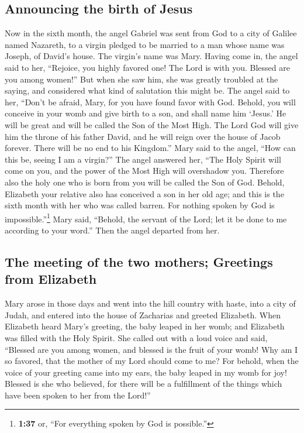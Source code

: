 \hypertarget{announcing-the-birth-of-jesus}{%
\subsection{Announcing the birth of
Jesus}\label{announcing-the-birth-of-jesus}}

 Now in the sixth month, the angel Gabriel was sent from
God to a city of Galilee named Nazareth,  to a virgin
pledged to be married to a man whose name was Joseph, of David's house.
The virgin's name was Mary.  Having come in, the angel
said to her, ``Rejoice, you highly favored one! The Lord is with you.
Blessed are you among women!''  But when she saw him, she
was greatly troubled at the saying, and considered what kind of
salutation this might be.  The angel said to her, ``Don't
be afraid, Mary, for you have found favor with God. 
Behold, you will conceive in your womb and give birth to a son, and
shall name him `Jesus.'  He will be great and will be
called the Son of the Most High. The Lord God will give him the throne
of his father David,  and he will reign over the house of
Jacob forever. There will be no end to his Kingdom.'' 
Mary said to the angel, ``How can this be, seeing I am a virgin?''
 The angel answered her, ``The Holy Spirit will come on
you, and the power of the Most High will overshadow you. Therefore also
the holy one who is born from you will be called the Son of God.
 Behold, Elizabeth your relative also has conceived a son
in her old age; and this is the sixth month with her who was called
barren.  For nothing spoken by God is
impossible.''\footnote{\textbf{1:37} or, ``For everything spoken by God
  is possible.''}  Mary said, ``Behold, the servant of
the Lord; let it be done to me according to your word.'' Then the angel
departed from her.

\hypertarget{the-meeting-of-the-two-mothers-greetings-from-elizabeth}{%
\subsection{The meeting of the two mothers; Greetings from
Elizabeth}\label{the-meeting-of-the-two-mothers-greetings-from-elizabeth}}

 Mary arose in those days and went into the hill country
with haste, into a city of Judah,  and entered into the
house of Zacharias and greeted Elizabeth.  When Elizabeth
heard Mary's greeting, the baby leaped in her womb; and Elizabeth was
filled with the Holy Spirit.  She called out with a loud
voice and said, ``Blessed are you among women, and blessed is the fruit
of your womb!  Why am I so favored, that the mother of my
Lord should come to me?  For behold, when the voice of
your greeting came into my ears, the baby leaped in my womb for joy!
 Blessed is she who believed, for there will be a
fulfillment of the things which have been spoken to her from the Lord!''

